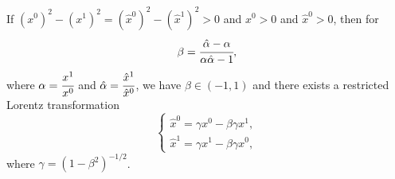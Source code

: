 \documentclass[main.tex]{subfiles}
\begin{document}
\begin{lemma}
\label{any-time-like}
If $(x^0)^2 - (x^1)^2 = (\hat{x}^0)^2 - (\hat{x}^1)^2 > 0$ and $x^0 > 0$ and $\hat{x}^0 > 0$, then for 
\begin{equation}
\beta = \cfrac{\hat{\alpha} - \alpha}{\alpha \hat{\alpha} - 1},
\end{equation}
where $\alpha = \cfrac{x^1}{x^0}$ and $\hat{\alpha} = \cfrac{\hat{x}^1}{\hat{x}^0}$,
we have $\beta\in (-1, 1)$ and there exists a restricted Lorentz transformation
\begin{equation}
\label{arbitrary-lorentz}
\begin{cases}
    \hat{x}^0 = \gamma x^0 - \beta \gamma x^1, \\
    \hat{x}^1 = \gamma x^1 -\beta \gamma x^0,
\end{cases}
\end{equation} 
where $\gamma = (1 - \beta^2)^{-1/2}$.
\end{lemma}
\end{document}
